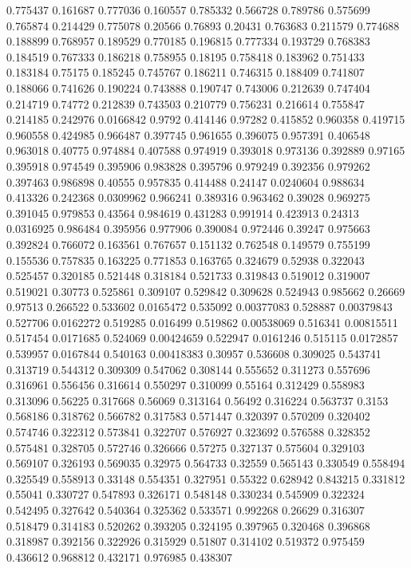 0.775437 0.161687
0.777036 0.160557
0.785332 0.566728
0.789786 0.575699
0.765874 0.214429
0.775078 0.20566
0.76893 0.20431
0.763683 0.211579
0.774688 0.188899
0.768957 0.189529
0.770185 0.196815
0.777334 0.193729
0.768383 0.184519
0.767333 0.186218
0.758955 0.18195
0.758418 0.183962
0.751433 0.183184
0.75175 0.185245
0.745767 0.186211
0.746315 0.188409
0.741807 0.188066
0.741626 0.190224
0.743888 0.190747
0.743006 0.212639
0.747404 0.214719
0.74772 0.212839
0.743503 0.210779
0.756231 0.216614
0.755847 0.214185
0.242976 0.0166842
0.9792 0.414146
0.97282 0.415852
0.960358 0.419715
0.960558 0.424985
0.966487 0.397745
0.961655 0.396075
0.957391 0.406548
0.963018 0.40775
0.974884 0.407588
0.974919 0.393018
0.973136 0.392889
0.97165 0.395918
0.974549 0.395906
0.983828 0.395796
0.979249 0.392356
0.979262 0.397463
0.986898 0.40555
0.957835 0.414488
0.24147 0.0240604
0.988634 0.413326
0.242368 0.0309962
0.966241 0.389316
0.963462 0.39028
0.969275 0.391045
0.979853 0.43564
0.984619 0.431283
0.991914 0.423913
0.24313 0.0316925
0.986484 0.395956
0.977906 0.390084
0.972446 0.39247
0.975663 0.392824
0.766072 0.163561
0.767657 0.151132
0.762548 0.149579
0.755199 0.155536
0.757835 0.163225
0.771853 0.163765
0.324679 0.52938
0.322043 0.525457
0.320185 0.521448
0.318184 0.521733
0.319843 0.519012
0.319007 0.519021
0.30773 0.525861
0.309107 0.529842
0.309628 0.524943
0.985662 0.26669
0.97513 0.266522
0.533602 0.0165472
0.535092 0.00377083
0.528887 0.00379843
0.527706 0.0162272
0.519285 0.016499
0.519862 0.00538069
0.516341 0.00815511
0.517454 0.0171685
0.524069 0.00424659
0.522947 0.0161246
0.515115 0.0172857
0.539957 0.0167844
0.540163 0.00418383
0.30957 0.536608
0.309025 0.543741
0.313719 0.544312
0.309309 0.547062
0.308144 0.555652
0.311273 0.557696
0.316961 0.556456
0.316614 0.550297
0.310099 0.55164
0.312429 0.558983
0.313096 0.56225
0.317668 0.56069
0.313164 0.56492
0.316224 0.563737
0.3153 0.568186
0.318762 0.566782
0.317583 0.571447
0.320397 0.570209
0.320402 0.574746
0.322312 0.573841
0.322707 0.576927
0.323692 0.576588
0.328352 0.575481
0.328705 0.572746
0.326666 0.57275
0.327137 0.575604
0.329103 0.569107
0.326193 0.569035
0.32975 0.564733
0.32559 0.565143
0.330549 0.558494
0.325549 0.558913
0.33148 0.554351
0.327951 0.55322
0.628942 0.843215
0.331812 0.55041
0.330727 0.547893
0.326171 0.548148
0.330234 0.545909
0.322324 0.542495
0.327642 0.540364
0.325362 0.533571
0.992268 0.26629
0.316307 0.518479
0.314183 0.520262
0.393205 0.324195
0.397965 0.320468
0.396868 0.318987
0.392156 0.322926
0.315929 0.51807
0.314102 0.519372
0.975459 0.436612
0.968812 0.432171
0.976985 0.438307

